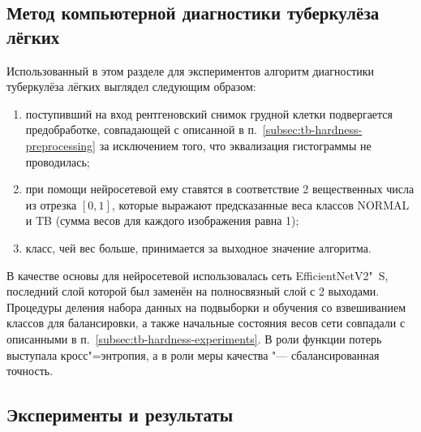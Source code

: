 \subsection{Метод компьютерной диагностики туберкулёза лёгких}\label{subsec:tbx-diagnostics}

Использованный в этом разделе для экспериментов алгоритм диагностики туберкулёза лёгких выглядел следующим образом:
\begin{enumerate}[beginpenalty=10000]
	\item поступивший на вход рентгеновский снимок грудной клетки подвергается предобработке, совпадающей с описанной в п.~\ref{subsec:tb-hardness-preprocessing} за исключением того, что эквализация гистограммы не проводилась;
	\item при помощи нейросетевой  ему ставятся в соответствие 2 вещественных числа из отрезка $\left[ 0, 1 \right]$, которые выражают предсказанные веса классов NORMAL и TB (сумма весов для каждого изображения равна 1);
	\item класс, чей вес больше, принимается за выходное значение алгоритма.
\end{enumerate}

В качестве основы для нейросетевой  использовалась сеть EfficientNetV2"~S, последний слой которой был заменён на полносвязный слой с 2 выходами. Процедуры деления набора данных на подвыборки и обучения  со взвешиванием классов для балансировки, а также начальные состояния весов сети совпадали с описанными в п.~\ref{subsec:tb-hardness-experiments}. В роли функции потерь выступала кросс"=энтропия, а в роли меры качества "--- сбалансированная точность.

%

\subsection{Эксперименты и результаты}

